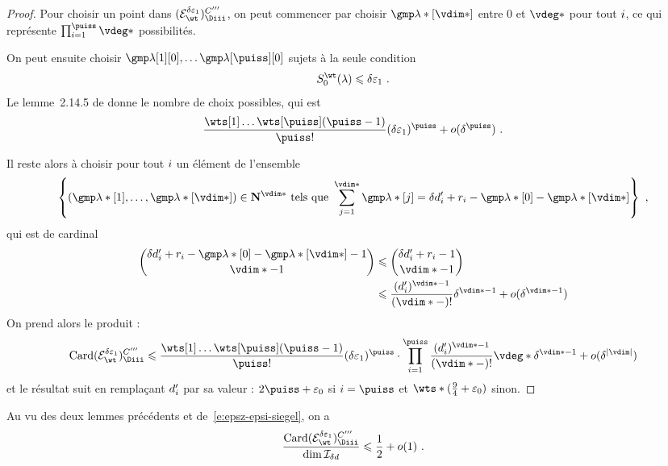 \begin{proof}
  Pour choisir un point dans \( (\stairs)\Ciii \), on peut commencer par
  choisir \( \imp*[\vdim*] \) entre \( 0 \) et \( \vdeg* \)
  pour tout \( i \), ce qui représente \( \prod\fctrange \vdeg* \)
  possibilités.

  On peut ensuite choisir \( \imp[1][0], \dots \imp[\puiss][0] \)
  sujets à la seule condition
  \begin{equation}
    \wtsum*(\lambda) \le \delta \epsi \pmm.
  \end{equation}
  Le lemme~2.14.5 de \cite{farhith} donne le nombre de choix possibles, qui
  est
  \begin{equation}
    \frac {\prodwt} {\puiss !} (\delta\epsi)^\puiss
    + o(\delta^\puiss)
    \pmm.
  \end{equation}

  Il reste alors à choisir pour tout \( i \) un élément de l'ensemble
  \begin{equation}
    \left\{
      (\imp*[1],  \dots, \imp*[\vdim*])
      \in \N ^{\vdim*}
      \text{ tels que }
      \sum_{j=1}^{\vdim*} \imp*[j]
      =
      \delta d'_\fct + r_\fct - \imp*[0] - \imp*[\vdim*]
    \right\}
    \pmm,
  \end{equation}
  qui est de cardinal
  \begin{align}
    \binom {
      \delta d'_\fct + r_\fct - \imp*[0] - \imp*[\vdim*] - 1
      }{
      \vdim* - 1
      }
    & \le
    \binom {
      \delta d'_\fct + r_\fct - 1
      }{
      \vdim* - 1
      }
    \\
    & \le
    \frac {(d'_\fct)^{\vdim* - 1}} {(\vdim* - )!} \delta^{\vdim* - 1}
    + o( \delta^{\vdim* - 1} )
  \end{align}
  On prend alors le produit :
  \begin{equation}
    \card (\stairs)\Ciii
    \le
    \frac {\prodwt} {\puiss !} (\delta\epsi)^\puiss
    \cdot \prod\fctrange
    \frac {(d'_\fct)^{\vdim* - 1}} {(\vdim* - )!}
    \vdeg* \delta^{\vdim* - 1}
    + o( \delta^{\lgr\vdim} )
  \end{equation}
  et le résultat suit en remplaçant \( d'_i \) par sa valeur : \( 2\puiss +
  \epsz \) si \( \fct = \puiss \) et \( \wts* (\frac94 + \epsz) \) sinon.
\end{proof}

Au vu des deux lemmes précédents et de~\eqref{e:epsz-epsi-siegel}, on a
\begin{equation} \label{e:good-codim}
  \frac {\card (\stairs)\Ciii} {\dim \Ideal_{\delta d}}
  \le
  \frac12 + o(1)
  \pmm.
\end{equation}

